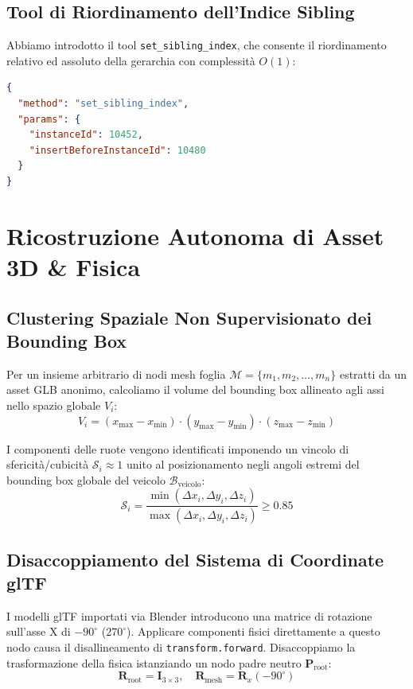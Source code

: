 \documentclass[11pt,a4paper]{article}
\begin{document}
\subsection{Tool di Riordinamento dell'Indice Sibling}
Abbiamo introdotto il tool \texttt{set\_sibling\_index}, che consente il riordinamento relativo ed assoluto della gerarchia con complessità $O(1)$:
\begin{lstlisting}[language=json]
{
  "method": "set_sibling_index",
  "params": {
    "instanceId": 10452,
    "insertBeforeInstanceId": 10480
  }
}
\end{lstlisting}

\section{Ricostruzione Autonoma di Asset 3D \& Fisica}

\subsection{Clustering Spaziale Non Supervisionato dei Bounding Box}
Per un insieme arbitrario di nodi mesh foglia $\mathcal{M} = \{m_1, m_2, \dots, m_n\}$ estratti da un asset GLB anonimo, calcoliamo il volume del bounding box allineato agli assi nello spazio globale $V_i$:
\begin{equation}
V_i = (x_{\max} - x_{\min}) \cdot (y_{\max} - y_{\min}) \cdot (z_{\max} - z_{\min})
\end{equation}

I componenti delle ruote vengono identificati imponendo un vincolo di sfericità/cubicità $\mathcal{S}_i \approx 1$ unito al posizionamento negli angoli estremi del bounding box globale del veicolo $\mathcal{B}_{\text{veicolo}}$:
\begin{equation}
\mathcal{S}_i = \frac{\min(\Delta x_i, \Delta y_i, \Delta z_i)}{\max(\Delta x_i, \Delta y_i, \Delta z_i)} \ge 0.85
\end{equation}

\subsection{Disaccoppiamento del Sistema di Coordinate glTF}
I modelli glTF importati via Blender introducono una matrice di rotazione sull'asse X di $-90^\circ$ ($270^\circ$). Applicare componenti fisici direttamente a questo nodo causa il disallineamento di \texttt{transform.forward}. Disaccoppiamo la trasformazione della fisica istanziando un nodo padre neutro $\mathbf{P}_{\text{root}}$:
\begin{equation}
\mathbf{R}_{\text{root}} = \mathbf{I}_{3 \times 3}, \quad \mathbf{R}_{\text{mesh}} = \mathbf{R}_x(-90^\circ)
\end{equation}
\end{document}
